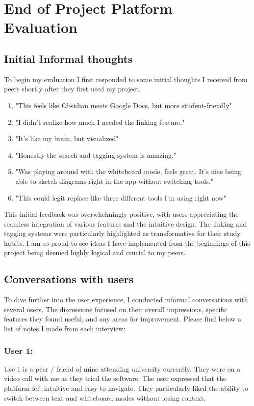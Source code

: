 \section{End of Project Platform Evaluation}
\label{Evaluation:PlatformEvaluation}
\subsection{Initial Informal thoughts}
To begin my evaluation I first responded to some initial thoughts I received from peers shortly after they first used my project.

\begin{enumerate}
    \item "This feels like Obsidian meets Google Docs, but more student-friendly"
    \item "I didn't realize how much I needed the linking feature." 
    \item "It's like my brain, but visualized"
    \item "Honestly the search and tagging system is amazing."
    \item "Was playing around with the whiteboard mode, feels great. It's nice being able to sketch diagrams right in the app without switching tools."
    \item "This could legit replace like three different tools I'm using right now"
\end{enumerate}

This initial feedback was overwhelmingly positive, with users appreciating the seamless integration of various features and the intuitive design. The linking and tagging systems were particularly highlighted as transformative for their study habits. I am so proud to see ideas I have implemented from the beginnings of this project being deemed highly logical and crucial to my peers.

\subsection{Conversations with users}
To dive further into the user experience, I conducted informal conversations with several users. The discussions focused on their overall impressions, specific features they found useful, and any areas for improvement. Please find below a list of notes I made from each interview:

\subsubsection*{User 1:}
Use 1 is a peer / friend of mine attending university currently. They were on a video call with me as they tried the software. The user expressed that the platform felt intuitive and easy to navigate. They particularly liked the ability to switch between text and whiteboard modes without losing context. 

